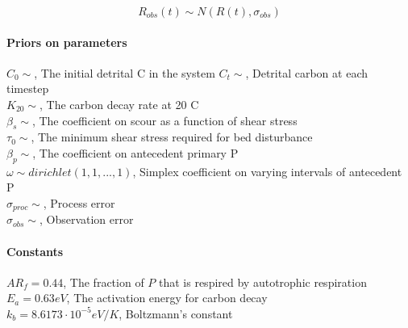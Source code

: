 \documentclass[
]{article}
\begin{document}
\[R_{obs}(t) \sim N(R(t), \sigma_{obs})\]

\hypertarget{priors-on-parameters}{%
\paragraph{Priors on parameters}\label{priors-on-parameters}}

\(C_0 \sim\), The initial detrital C in the system \(C_t \sim\),
Detrital carbon at each timestep\\
\(K_{20} \sim\), The carbon decay rate at 20 C\\
\(\beta_s \sim\), The coefficient on scour as a function of shear
stress\\
\(\tau_0 \sim\), The minimum shear stress required for bed disturbance\\
\(\beta_p \sim\), The coefficient on antecedent primary P\\
\(\omega \sim dirichlet(1,1,...,1)\), Simplex coefficient on varying
intervals of antecedent P\\
\(\sigma_{proc} \sim\), Process error\\
\(\sigma_{obs} \sim\), Observation error

\hypertarget{constants}{%
\paragraph{Constants}\label{constants}}

\(AR_f = 0.44\), The fraction of \(P\) that is respired by autotrophic
respiration\\
\(E_a = 0.63 eV\), The activation energy for carbon decay\\
\(k_b = 8.6173 \cdot 10^{-5} eV/K\), Boltzmann's constant
\end{document}
